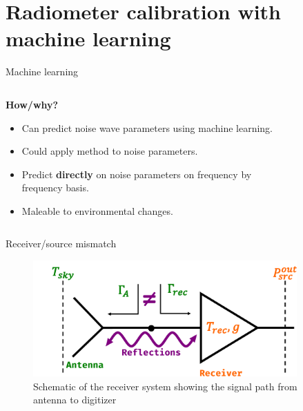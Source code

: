 \documentclass[aspectratio=169]{beamer}
\begin{document}
\section{Radiometer calibration with machine learning}
\begin{frame}{\small{Machine learning}}
	\begin{columns}
		\begin{column}{0.35\textwidth}
			\textbf{How/why?}
			\begin{itemize}
				\item Can predict noise wave parameters using machine learning.
				\item Could apply method to noise parameters.
				\item Predict \textbf{directly} on noise parameters on frequency by frequency basis.
				\item Maleable to environmental changes.
			\end{itemize}
		\end{column}
		\begin{column}{0.65\textwidth}
			\begin{figure}[h]
				
			\end{figure}
		\end{column}
	\end{columns}
\end{frame}

\begin{frame}{\small{Receiver/source mismatch}}
	\begin{figure}[h]
		\centering
		\includegraphics[width=0.9\textwidth]{images/intro_receiver.pdf}
		\caption{Schematic of the receiver system showing the signal path from antenna to digitizer}
	\end{figure}
\end{frame}
\end{document}

